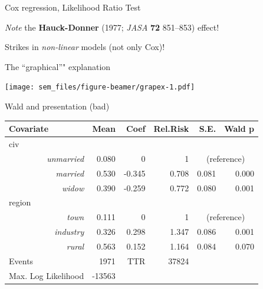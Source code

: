 \begin{frame}{Cox regression, Likelihood Ratio Test}

\emph{Note} the \textbf{Hauck-Donner} (1977; \emph{JASA} \textbf{72}
851--853) effect!

Strikes in \emph{non-linear} models (not only Cox)!

\end{frame}

\begin{frame}{The ``graphical''" explanation}

\texttt{[image: sem\_files/figure-beamer/grapex-1.pdf]}

\end{frame}

\begin{frame}{Wald and presentation (bad)}

\begin{table}[ht] 
\begin{center} 
\begin{tabular}{lrrrrr} 
\hline 
Covariate & Mean & Coef & Rel.Risk & S.E. &   Wald p \\ \hline
civ  \\ 
\multicolumn{1}{r}{\em unmarried} &    0.080 & 0 & 1 & \multicolumn{2}{c}{(reference)} \\ 
\multicolumn{1}{r}{ \em married }  &     0.530  &  -0.345  &  0.708  &  0.081 & 0.000\\ 
\multicolumn{1}{r}{ \em widow }  &     0.390  &  -0.259  &  0.772  &  0.080 & 0.001\\ 
region  \\ 
\multicolumn{1}{r}{\em town} &    0.111 & 0 & 1 & \multicolumn{2}{c}{(reference)} \\ 
\multicolumn{1}{r}{ \em industry }  &     0.326  &  0.298  &  1.347  &  0.086 & 0.001\\ 
\multicolumn{1}{r}{ \em rural }  &     0.563  &  0.152  &  1.164  &  0.084 & 0.070\\ 
\hline 
Events &  1971  & TTR &  37824 \\ 
Max. Log Likelihood &  -13563 \\ \hline 
\hline 
\end{tabular}
\end{center} 
\end{table}

\end{frame}

